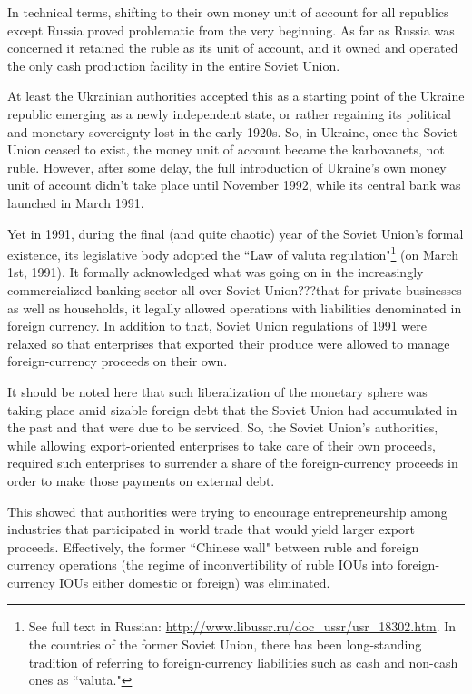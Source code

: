 In technical terms, shifting to their own money unit of account for all republics except Russia proved problematic from the very beginning. As far as Russia was concerned it retained the ruble as its unit of account, and it owned and operated the only cash production facility in the entire Soviet Union.

At least the Ukrainian authorities accepted this as a starting point of the Ukraine republic emerging as a newly independent state, or rather regaining its political and monetary sovereignty lost in the early 1920s. So, in Ukraine, once the Soviet Union ceased to exist, the money unit of account became the  karbovanets, not ruble. However, after some delay, the full introduction of Ukraine's own money unit of account didn't take place until November 1992, while its central bank was launched in March 1991.

Yet in 1991, during the final (and quite chaotic) year of the Soviet Union's formal existence, its legislative body adopted the ``Law of valuta regulation"\footnote{See full text in Russian: \url{http://www.libussr.ru/doc_ussr/usr_18302.htm}. In the countries of the former Soviet Union, there has been long-standing tradition of referring to foreign-currency liabilities such as cash and non-cash ones as ``valuta."} (on March 1st, 1991). It formally acknowledged what was going on in the increasingly commercialized banking sector all over Soviet Union???that for private businesses as well as households, it legally allowed operations with liabilities denominated in foreign currency. In addition to that, Soviet Union regulations of 1991 were relaxed so that enterprises that exported their produce were allowed to manage foreign-currency proceeds on their own. 

It should be noted here that such liberalization of the monetary sphere was taking place amid sizable foreign debt that the Soviet Union had accumulated in the past and that were due to be serviced. So, the Soviet Union's authorities, while allowing export-oriented enterprises to take care of their own proceeds, required such enterprises to surrender a share of the foreign-currency proceeds in order to make those payments on external debt. 

This showed that authorities were trying to encourage entrepreneurship among industries that participated in world trade that would yield larger export proceeds. Effectively, the former ``Chinese wall" between ruble and foreign currency operations (the regime of inconvertibility of ruble IOUs into foreign-currency IOUs either domestic or foreign) was eliminated.

